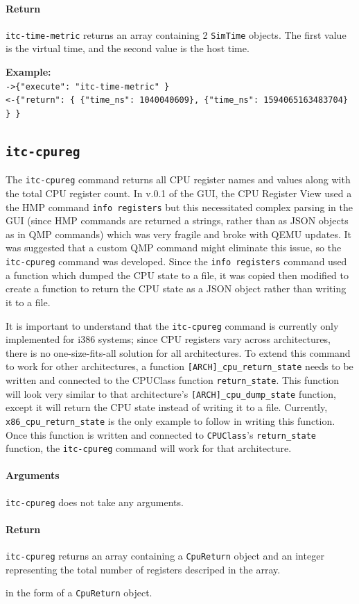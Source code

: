 \documentclass{article}
\newcommand{\code}[1]{\texttt{#1}}
\begin{document}
\paragraph{Return} \code{itc-time-metric} returns an array containing 2 \code{SimTime} objects. The first value is the virtual time, and the second value is the host time.

\textbf{Example:}\\
\code{->\{"execute": "itc-time-metric" \}}\\
\code{<-\{"return": \{ \{"time\_ns": 1040040609\}, \{"time\_ns": 1594065163483704\} \} \}}


\subsection{\code{itc-cpureg}}
The \code{itc-cpureg} command returns all CPU register names and values along with the total CPU register count. In v.0.1 of the GUI, the CPU Register View used a the HMP command \code{info registers} but this necessitated complex parsing in the GUI (since HMP commands are returned a strings, rather than as JSON objects  as in QMP commands) which was very fragile and broke with QEMU updates. It was suggested that a custom QMP command might eliminate this issue, so the \code{itc-cpureg} command was developed. Since the \code{info registers} command used a function which dumped the CPU state to a file, it was copied then modified to create a function to return the CPU state as a JSON object rather than writing it to a file. 

It is important to understand that the \code{itc-cpureg} command is currently only implemented for i386 systems; since CPU registers vary across architectures, there is no one-size-fits-all solution for all architectures. To extend this command to work for other architectures, a function  \code{[ARCH]\_cpu\_return\_state} needs to be written and connected to the CPUClass function \code{return\_state}. This function will look very similar to that architecture's \code{[ARCH]\_cpu\_dump\_state} function, except it will return the CPU state instead of writing it to a file. Currently, \code{x86\_cpu\_return\_state} is the only example to follow in writing this function. Once this function is written and connected to \code{CPUClass}'s \code{return\_state} function, the \code{itc-cpureg} command will work for that architecture.


\paragraph{Arguments} \code{itc-cpureg} does not take any arguments.

\paragraph{Return} \code{itc-cpureg} returns an array containing a \code{CpuReturn} object and an integer representing the total number of registers descriped in the array.

 in the form of a \code{CpuReturn} object.
\end{document}
